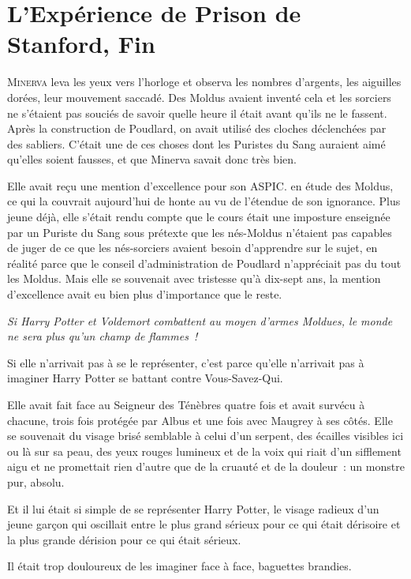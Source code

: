 \chapter{L'Expérience de Prison de Stanford, Fin}

\lettrine{M}{inerva} leva les yeux vers l'horloge et observa les nombres d'argents, les aiguilles dorées, leur mouvement saccadé.
Des Moldus avaient inventé cela et les sorciers ne s'étaient pas souciés de savoir quelle heure il était avant qu'ils ne le fassent.
Après la construction de Poudlard, on avait utilisé des cloches déclenchées par des sabliers.
C'était une de ces choses dont les Puristes du Sang auraient aimé qu'elles soient fausses, et que Minerva savait donc très bien.

Elle avait reçu une mention d'excellence pour son ASPIC. en étude des Moldus, ce qui la couvrait aujourd'hui de honte au vu de l'étendue de son ignorance.
Plus jeune déjà, elle s'était rendu compte que le cours était une imposture enseignée par un Puriste du Sang sous prétexte que les nés-Moldus n'étaient pas capables de juger de ce que les nés-sorciers avaient besoin d'apprendre sur le sujet, en réalité parce que le conseil d'administration de Poudlard n'appréciait pas du tout les Moldus.
Mais elle se souvenait avec tristesse qu'à dix-sept ans, la mention d'excellence avait eu bien plus d'importance que le reste.

\emph{Si Harry Potter et Voldemort combattent au moyen d'armes Moldues, le monde ne sera plus qu'un champ de flammes~!}

Si elle n'arrivait pas à se le représenter, c'est parce qu'elle n'arrivait pas à imaginer Harry Potter se battant contre Vous-Savez-Qui.

Elle avait fait face au Seigneur des Ténèbres quatre fois et avait survécu à chacune, trois fois protégée par Albus et une fois avec Maugrey à ses côtés.
Elle se souvenait du visage brisé semblable à celui d'un serpent, des écailles visibles ici ou là sur sa peau, des yeux rouges lumineux et de la voix qui riait d'un sifflement aigu et ne promettait rien d'autre que de la cruauté et de la douleur~: un monstre pur, absolu.

Et il lui était si simple de se représenter Harry Potter, le visage radieux d'un jeune garçon qui oscillait entre le plus grand sérieux pour ce qui était dérisoire et la plus grande dérision pour ce qui était sérieux.

Il était trop douloureux de les imaginer face à face, baguettes brandies.

